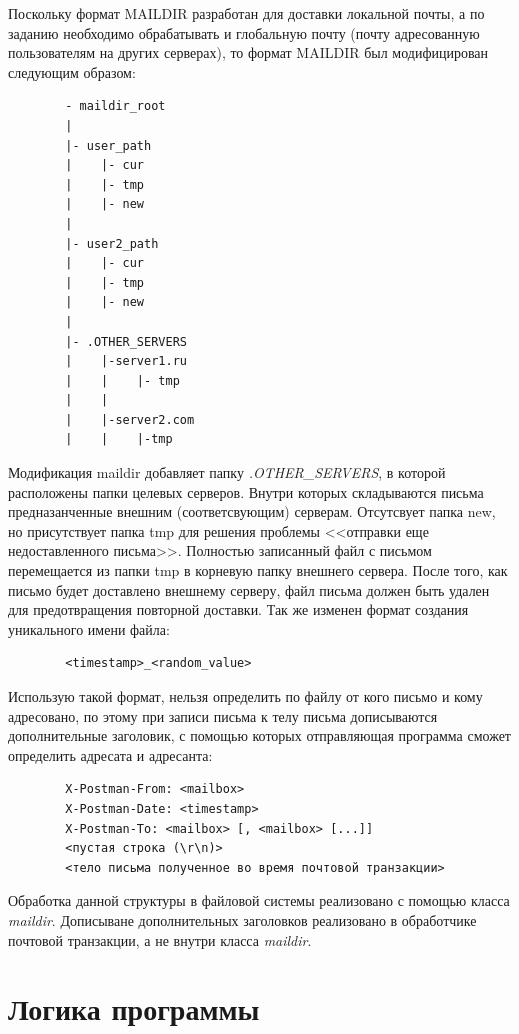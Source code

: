 \documentclass[a4paper,12pt]{report}
\begin{document}
    Поскольку формат MAILDIR разработан для доставки локальной почты, а по заданию необходимо обрабатывать и глобальную почту (почту адресованную пользователям на других серверах), то формат MAILDIR был модифицирован следующим образом: 
        
        \begin{verbatim}
        - maildir_root
        |
        |- user_path
        |    |- cur
        |    |- tmp
        |    |- new
        |
        |- user2_path
        |    |- cur
        |    |- tmp
        |    |- new
        |
        |- .OTHER_SERVERS
        |    |-server1.ru
        |    |    |- tmp
        |    |
        |    |-server2.com
        |    |    |-tmp

    \end{verbatim}
    Модификация maildir добавляет папку \textit{.OTHER\_SERVERS}, в которой расположены папки целевых серверов. Внутри которых складываются письма предназанченные внешним (соответсвующим) серверам. Отсутсвует папка new, но присутствует папка tmp для решения проблемы <<отправки еще недоставленного письма>>. Полностью записанный файл с письмом перемещается из папки tmp в корневую папку внешнего сервера. После того, как письмо будет доставлено внешнему серверу, файл письма должен быть удален для предотвращения повторной доставки. Так же изменен формат создания уникального имени файла:
    \begin{verbatim}
        <timestamp>_<random_value>
    \end{verbatim}
    Использую такой формат, нельзя определить по файлу от кого письмо и кому адресовано, по этому при записи письма  к телу письма дописываются дополнительные заголовик, с помощью которых отправляющая программа сможет определить адресата и адресанта:
    \begin{verbatim}
        X-Postman-From: <mailbox>
        X-Postman-Date: <timestamp>
        X-Postman-To: <mailbox> [, <mailbox> [...]]
        <пустая строка (\r\n)>
        <тело письма полученное во время почтовой транзакции>
    \end{verbatim}
    
    Обработка данной структуры в файловой системы реализовано с помощью класса \textit{maildir}. Дописыване дополнительных заголовков реализовано в обработчике почтовой транзакции, а не внутри класса \textit{maildir}.

\section{Логика программы}
\end{document}

